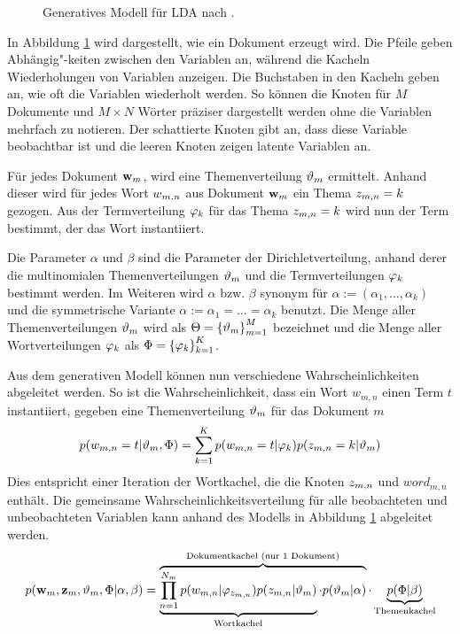 \begin{figure}[ht]
  \centering
  
  \caption{Generatives Modell für LDA nach \citep{Blei2003LDA}.}
  \label{fig:ldaModel}
\end{figure}

In Abbildung \ref{fig:ldaModel} wird dargestellt, wie ein Dokument erzeugt wird. Die Pfeile geben Abhängig"-keiten zwischen den Variablen an, während die Kacheln Wiederholungen von Variablen anzeigen. Die Buchstaben in den Kacheln geben an, wie oft die Variablen wiederholt werden. So können die Knoten für $M$ Dokumente und $M \times N$ Wörter präziser dargestellt werden ohne die Variablen mehrfach zu notieren. Der schattierte Knoten gibt an, dass diese Variable beobachtbar ist und die leeren Knoten zeigen latente Variablen an. 

Für jedes Dokument $\mathbf{w}_m$, wird eine Themenverteilung $\vartheta_{m}$ ermittelt. Anhand dieser wird für jedes Wort $w_{m,n}$ aus Dokument $\mathbf{w}_m$ ein Thema $z_{m,n}=k$ gezogen. Aus der Termverteilung $\varphi_{k}$ für das Thema $z_{m,n}=k$ wird nun der Term bestimmt, der das Wort instantiiert. 

Die Parameter $\alpha$ und $\beta$ sind die Parameter der Dirichletverteilung, anhand derer die multinomialen Themenverteilungen $\vartheta_{m}$ und die Termverteilungen $\varphi_{k}$ bestimmt werden. Im Weiteren wird $\alpha$ bzw. $\beta$ synonym für $\alpha := (\alpha_1,\ldots,\alpha_k)$ und die symmetrische Variante $\alpha := \alpha_1 = \ldots = \alpha_k$ benutzt. Die Menge aller Themenverteilungen $\vartheta_{m}$ wird als $\Theta = \left\{\vartheta_{m}\right\}^M_{m=1}$ bezeichnet und die Menge aller Wortverteilungen $\varphi_{k}$ als $\Phi = \left\{\varphi_{k}\right\}^K_{k=1}$. 

Aus dem generativen Modell können nun verschiedene Wahrscheinlichkeiten abgeleitet werden. So ist die Wahrscheinlichkeit, dass ein Wort $w_{m,n}$ einen Term $t$ instantiiert, gegeben eine Themenverteilung $\vartheta_{m}$ für das Dokument $m$
\begin{equation}
  p(w_{m,n}=t|\vartheta_{m},\Phi) = \sum^K_{k=1} p(w_{m,n}=t|\varphi_{k})p(z_{m,n}=k|  \vartheta_{m})
\label{eq:ldaWordProbabilty}
\end{equation}
Dies entspricht einer Iteration der Wortkachel, die die Knoten $z_{m,n}$ und $word_{m,n}$ enthält. Die gemeinsame Wahrscheinlichkeitsverteilung für alle beobachteten und unbeobachteten Variablen kann anhand des Modells in Abbildung \ref{fig:ldaModel} abgeleitet werden. 
\begin{equation}
p(\mathbf{w}_m,\mathbf{z}_m,\vartheta_{m},\Phi|\alpha,\beta) = \overbrace{\underbrace{\prod^{N_m}_{n=1}p(w_{m,n}|\varphi_{z_{m,n}})p(z_{m,n}|\vartheta_{m})}_{\text{Wortkachel}} \cdot p(\vartheta_{m}|\alpha)}^{\text{Dokumentkachel (nur 1 Dokument)}} \cdot \underbrace{p(\Phi|\beta)}_{\text{Themenkachel}}
\label{eq:ldaDocJointDistribution}
\end{equation}

